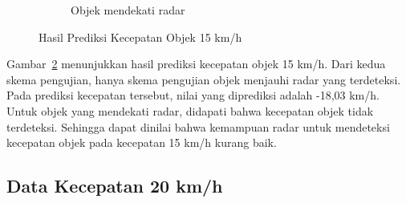 \begin{figure}
\begin{subfigure}[b]{0.45\textwidth}
		\caption{Objek mendekati radar}
		\label{fig:pengambilan15MT}
    \end{subfigure}
    \caption{Hasil Prediksi Kecepatan Objek 15 km/h}
    \label{fig:pengambilan15}
\end{figure}

Gambar~\ref{fig:pengambilan15} menunjukkan hasil prediksi kecepatan objek 15 km/h. Dari kedua skema pengujian, hanya skema pengujian objek menjauhi radar yang terdeteksi. Pada prediksi kecepatan tersebut, nilai yang diprediksi adalah -18,03 km/h. Untuk objek yang mendekati radar, didapati bahwa kecepatan objek tidak terdeteksi. Sehingga dapat dinilai bahwa kemampuan radar untuk mendeteksi kecepatan objek pada kecepatan 15 km/h kurang baik.

\subsection{Data Kecepatan 20 km/h}

